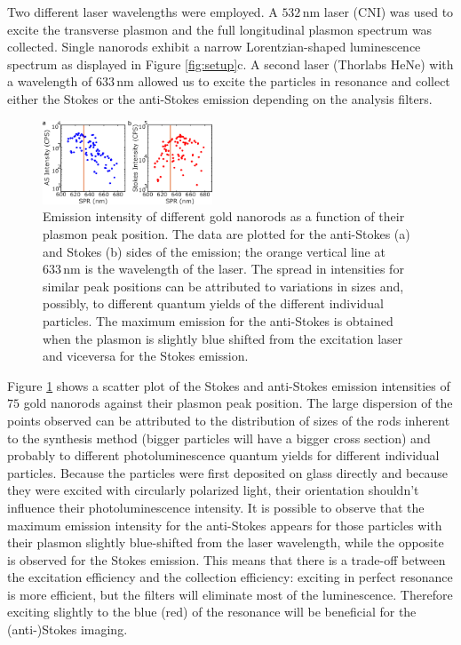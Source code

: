 \documentclass[journal=nalefd,manuscript=letter]{achemso}
\newcommand{\nm}{\ensuremath{\,\textrm{nm}}}
\begin{document}
Two different laser wavelengths were employed. A $532\nm$ laser (CNI) was used
to excite the transverse plasmon and the full longitudinal plasmon
spectrum was collected. Single nanorods exhibit a narrow Lorentzian-shaped luminescence
spectrum as displayed in Figure \ref{fig:setup}c. A second laser (Thorlabs HeNe)
with a wavelength of $633\nm$ allowed us to excite the particles in resonance
and collect either the Stokes or the anti-Stokes emission depending on the
analysis filters.

\begin{figure}[htp] \centering
\includegraphics[width=0.45\textwidth]{Figures/03_Intensity_SPR/Intensity_SPR.png}
\caption{Emission intensity of different gold nanorods as a function of their
plasmon peak position. The data are plotted for the anti-Stokes (a) and Stokes
(b) sides of the emission; the orange vertical line at $633\nm$ is the
wavelength of the laser. The spread in intensities for similar peak positions
can be attributed to variations in sizes and, possibly, to different quantum
yields of the different individual particles. The maximum emission for the
anti-Stokes is obtained when the plasmon is slightly blue shifted from the
excitation laser and viceversa for the Stokes emission.}
	\label{fig:emission_peak_position}
\end{figure} 

Figure \ref{fig:emission_peak_position} shows a scatter plot of the Stokes and
anti-Stokes emission intensities of $75$ gold nanorods against their plasmon
peak position. The large dispersion of the points observed can be attributed to
the distribution of sizes of the rods inherent to the synthesis
method\cite{Zijlstra2011} (bigger particles will have a bigger cross section)
and probably to different photoluminescence quantum yields for different
individual particles. Because the particles were first deposited on glass
directly and because they were excited with circularly polarized light, their
orientation shouldn't influence their photoluminescence intensity. It is
possible to observe that the maximum emission intensity for the anti-Stokes
appears for those particles with their plasmon slightly blue-shifted from the
laser wavelength, while the opposite is observed for the Stokes emission. This
means that there is a trade-off between the excitation efficiency and the
collection efficiency: exciting in perfect resonance is more efficient, but the
filters will eliminate most of the luminescence. Therefore exciting slightly to
the blue (red) of the resonance will be beneficial for the (anti-)Stokes
imaging.
\end{document}
